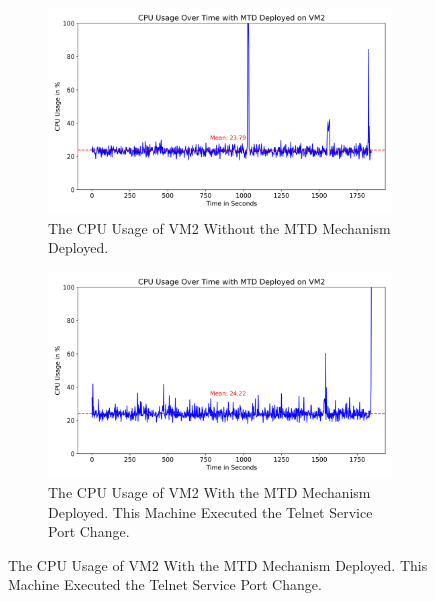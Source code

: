 \begin{figure}
     \centering
     \begin{subfigure}[b]{0.8\textwidth}
         \centering
         \includegraphics[width=\textwidth]{assets/CPUVM2MTDNotDeployed.png}
         \caption{The CPU Usage of VM2 Without the MTD Mechanism Deployed.}
         \label{graphic:CPUVM2MTDNotDeployed}
     \end{subfigure}
     \hfill
        \begin{subfigure}[b]{0.8\textwidth}
         \centering
         \includegraphics[width=\textwidth]{assets/CPUVM2MTDDeployed.png}
         \caption{The CPU Usage of VM2 With the MTD Mechanism Deployed. This Machine Executed the Telnet Service Port Change.}
         \label{graphic:CPUVM2MTDDeployed}
     \end{subfigure}
     \hfill
\end{figure}


